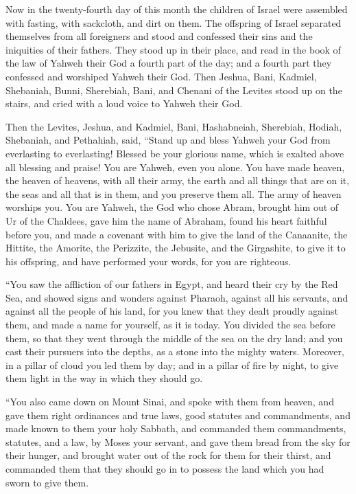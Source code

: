  Now in the twenty-fourth day of this month the children of
Israel were assembled with fasting, with sackcloth, and dirt on them.
 The offspring of Israel separated themselves from all
foreigners and stood and confessed their sins and the iniquities of
their fathers.  They stood up in their place, and read in
the book of the law of Yahweh their God a fourth part of the day; and a
fourth part they confessed and worshiped Yahweh their God. 
Then Jeshua, Bani, Kadmiel, Shebaniah, Bunni, Sherebiah, Bani, and
Chenani of the Levites stood up on the stairs, and cried with a loud
voice to Yahweh their God.

 Then the Levites, Jeshua, and Kadmiel, Bani, Hashabneiah,
Sherebiah, Hodiah, Shebaniah, and Pethahiah, said, ``Stand up and bless
Yahweh your God from everlasting to everlasting! Blessed be your
glorious name, which is exalted above all blessing and praise!
 You are Yahweh, even you alone. You have made heaven, the
heaven of heavens, with all their army, the earth and all things that
are on it, the seas and all that is in them, and you preserve them all.
The army of heaven worships you.  You are Yahweh, the God
who chose Abram, brought him out of Ur of the Chaldees, gave him the
name of Abraham,  found his heart faithful before you, and
made a covenant with him to give the land of the Canaanite, the Hittite,
the Amorite, the Perizzite, the Jebusite, and the Girgashite, to give it
to his offspring, and have performed your words, for you are righteous.

 ``You saw the affliction of our fathers in Egypt, and heard
their cry by the Red Sea,  and showed signs and wonders
against Pharaoh, against all his servants, and against all the people of
his land, for you knew that they dealt proudly against them, and made a
name for yourself, as it is today.  You divided the sea
before them, so that they went through the middle of the sea on the dry
land; and you cast their pursuers into the depths, as a stone into the
mighty waters.  Moreover, in a pillar of cloud you led them
by day; and in a pillar of fire by night, to give them light in the way
in which they should go.

 ``You also came down on Mount Sinai, and spoke with them
from heaven, and gave them right ordinances and true laws, good statutes
and commandments,  and made known to them your holy
Sabbath, and commanded them commandments, statutes, and a law, by Moses
your servant,  and gave them bread from the sky for their
hunger, and brought water out of the rock for them for their thirst, and
commanded them that they should go in to possess the land which you had
sworn to give them.

